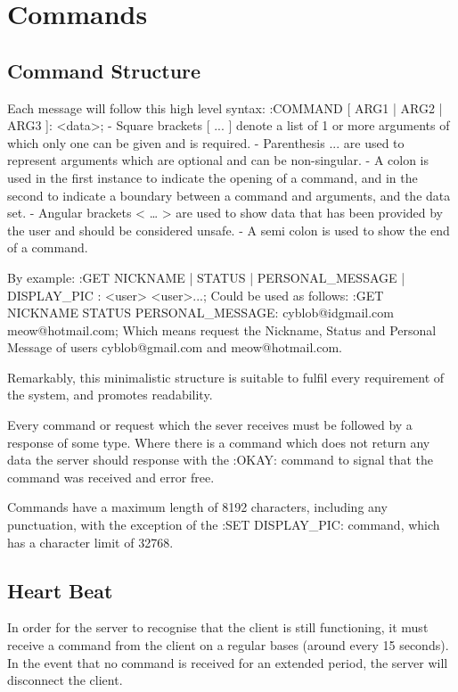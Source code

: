 \section{Commands}

\subsection{Command Structure}

Each message will follow this high level syntax:
:COMMAND [ ARG1 | ARG2 | ARG3 ]: <data>;
- Square brackets [ ... ] denote a list of 1 or more arguments of which only one can be given and is required.  
- Parenthesis { ... } are used to represent arguments which are optional and can be non-singular.
- A colon is used in the first instance to indicate the opening of a command, and in the second to indicate a boundary between a command and arguments, and the data set.
- Angular brackets < … > are used to show data that has been provided by the user and should be considered unsafe.
- A semi colon is used to show the end of a command.

By example:
:GET { NICKNAME | STATUS | PERSONAL_MESSAGE | DISPLAY_PIC }: <user> <user>...;
Could be used as follows:
:GET NICKNAME STATUS PERSONAL_MESSAGE: cyblob@idgmail.com meow@hotmail.com;
Which means request the Nickname, Status and Personal Message of users cyblob@gmail.com and meow@hotmail.com.

Remarkably, this minimalistic structure is suitable to fulfil every requirement of the system, and promotes readability.

Every command or request which the sever receives must be followed by a response of some type. Where there is a command which does not return any data the server should response with the :OKAY: command to signal that the command was received and error free.

Commands have a maximum length of 8192 characters, including any punctuation, with the exception of the :SET DISPLAY_PIC: command, which has a character limit of 32768.
\subsection{Heart Beat}

In order for the server to recognise that the client is still functioning, it must receive a command from the client on a regular bases (around every 15 seconds). In the event that no command is received for an extended period, the server will disconnect the client.

